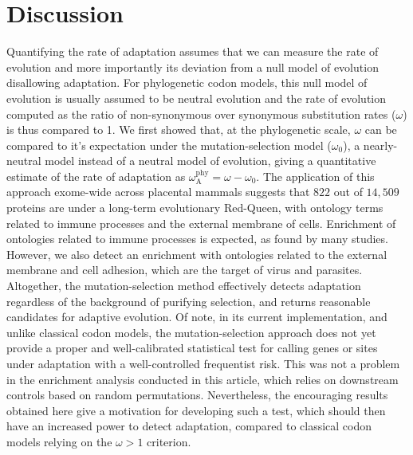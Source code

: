 \documentclass{article}
\newcommand{\rateApop}{\omega_{\mathrm{A}}}
\newcommand{\rateAphy}{\rateApop^{\mathrm{phy}}}
\begin{document}
    \section*{Discussion}\label{sec:discussion}

    Quantifying the rate of adaptation assumes that we can measure the rate of evolution and more importantly its deviation from a null model of evolution disallowing adaptation.
    For phylogenetic codon models, this null model of evolution is usually assumed to be neutral evolution and the rate of evolution computed as the ratio of non-synonymous over synonymous substitution rates ($\omega$) is thus compared to 1.
    We first showed that, at the phylogenetic scale, $\omega$ can be compared to it's expectation under the mutation-selection model ($\omega_{0}$), a nearly-neutral model instead of a neutral model of evolution, giving a quantitative estimate of the rate of adaptation as $\rateAphy = \omega - \omega_{0}$.
    The application of this approach exome-wide across placental mammals suggests that $822$ out of $14,509$ proteins are under a long-term evolutionary Red-Queen, with ontology terms related to immune processes and the external membrane of cells.
    Enrichment of ontologies related to immune processes is expected, as found by many studies\cite{kosiol_patterns_2008, enard_viruses_2016, ebel_high_2017}.
    However, we also detect an enrichment with ontologies related to the external membrane and cell adhesion, which are the target of virus and parasites.
    Altogether, the mutation-selection method effectively detects adaptation regardless of the background of purifying selection, and returns reasonable candidates for adaptive evolution.
    Of note, in its current implementation, and unlike classical codon models\cite{wong_accuracy_2004, yang_paml_2007}, the mutation-selection approach does not yet provide a proper and well-calibrated statistical test for calling genes or sites under adaptation with a well-controlled frequentist risk.
    This was not a problem in the enrichment analysis conducted in this article, which relies on downstream controls based on random permutations.
    Nevertheless, the encouraging results obtained here give a motivation for developing such a test, which should then have an increased power to detect adaptation, compared to classical codon models relying on the $\omega > 1$ criterion.
\end{document}
